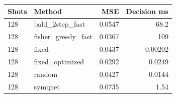 \begin{tabular}{llrr}
\toprule
Shots & Method & MSE & Decision ms \\
\midrule
128 & bald\_2step\_fast & 0.0547 & 68.2 \\
128 & fisher\_greedy\_fast & 0.0367 & 109 \\
128 & fixed & 0.0437 & 0.00202 \\
128 & fixed\_optimized & 0.0292 & 0.0249 \\
128 & random & 0.0427 & 0.0144 \\
128 & symqnet & 0.0735 & 1.54 \\
\bottomrule
\end{tabular}

